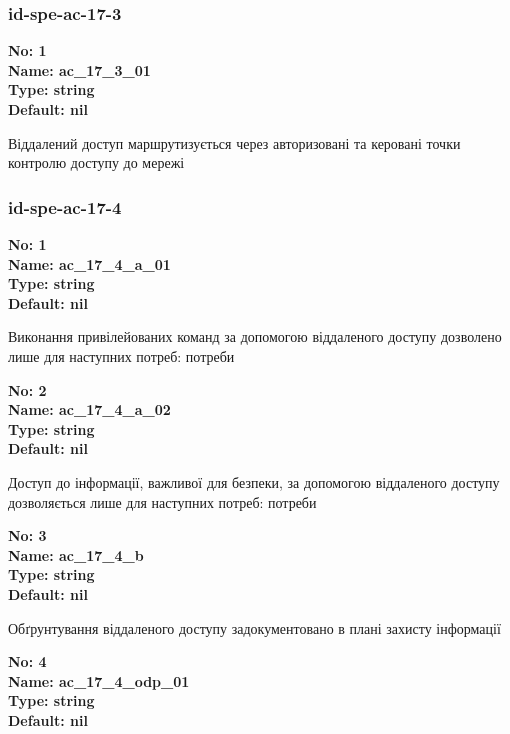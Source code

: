 \documentclass{article}
\begin{document}
\subsubsection{id-spe-ac-17-3}


\vspace{10pt}
{\footnotesize\bfseries
No: 1\\
Name: ac\_\allowbreak{}17\_\allowbreak{}3\_\allowbreak{}01\\
Type: string\\
Default: nil
}

{\footnotesize Віддалений доступ маршрутизується через авторизовані та керовані точки контролю доступу до мережі}




\subsubsection{id-spe-ac-17-4}


\vspace{10pt}
{\footnotesize\bfseries
No: 1\\
Name: ac\_\allowbreak{}17\_\allowbreak{}4\_\allowbreak{}a\_\allowbreak{}01\\
Type: string\\
Default: nil
}

{\footnotesize Виконання привілейованих команд за допомогою віддаленого доступу дозволено лише для наступних потреб: потреби }


{\footnotesize\bfseries
No: 2\\
Name: ac\_\allowbreak{}17\_\allowbreak{}4\_\allowbreak{}a\_\allowbreak{}02\\
Type: string\\
Default: nil
}

{\footnotesize Доступ до інформації, важливої для безпеки, за допомогою віддаленого доступу дозволяється лише для наступних потреб: потреби }


{\footnotesize\bfseries
No: 3\\
Name: ac\_\allowbreak{}17\_\allowbreak{}4\_\allowbreak{}b\\
Type: string\\
Default: nil
}

{\footnotesize Обґрунтування віддаленого доступу задокументовано в плані захисту інформації}


{\footnotesize\bfseries
No: 4\\
Name: ac\_\allowbreak{}17\_\allowbreak{}4\_\allowbreak{}odp\_\allowbreak{}01\\
Type: string\\
Default: nil
}
\end{document}
